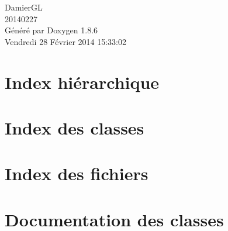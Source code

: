 \documentclass[twoside]{book}
\newcommand{\clearemptydoublepage}{%
  \newpage{\pagestyle{empty}\cleardoublepage}%
}
\begin{document}
\hypersetup{pageanchor=false}
\begin{titlepage}
\vspace*{7cm}
\begin{center}%
{\Large Damier\-G\-L \\[1ex]\large 20140227 }\\
\vspace*{1cm}
{\large Généré par Doxygen 1.8.6}\\
\vspace*{0.5cm}
{\small Vendredi 28 Février 2014 15:33:02}\\
\end{center}
\end{titlepage}
\clearemptydoublepage
\tableofcontents
\clearemptydoublepage
{}
\hypersetup{pageanchor=true}

\chapter{Index hiérarchique}

\chapter{Index des classes}

\chapter{Index des fichiers}

\chapter{Documentation des classes}





















\end{document}
